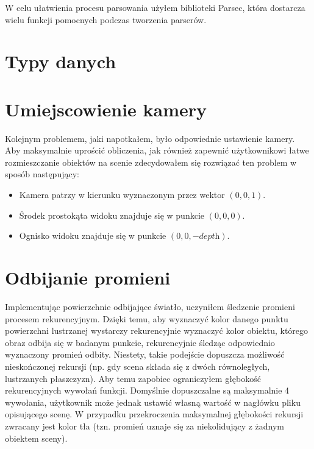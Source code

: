 \documentclass[11pt,a4paper]{article}
\begin{document}
W celu ułatwienia procesu parsowania użyłem biblioteki Parsec, która dostarcza wielu funkcji pomocnych podczas tworzenia parserów.
\section{Typy danych}

\section{Umiejscowienie kamery}
Kolejnym problemem, jaki napotkałem, było odpowiednie ustawienie kamery. Aby maksymalnie uprościć obliczenia, jak również zapewnić użytkownikowi łatwe rozmieszczanie obiektów na scenie zdecydowałem się rozwiązać ten problem w sposób następujący:
\begin{itemize}
\item Kamera patrzy w kierunku wyznaczonym przez wektor $(0, 0, 1)$.
\item Środek prostokąta widoku znajduje się w punkcie $(0, 0, 0)$.
\item Ognisko widoku znajduje się w punkcie $(0, 0, -\textit{depth})$.
\end{itemize}
\section{Odbijanie promieni}
Implementując powierzchnie odbijające światło, uczyniłem śledzenie promieni procesem rekurencyjnym. Dzięki temu, aby wyznaczyć kolor danego punktu powierzchni lustrzanej wystarczy rekurencyjnie wyznaczyć kolor obiektu, którego obraz odbija się w badanym punkcie, rekurencyjnie śledząc odpowiednio wyznaczony promień odbity. Niestety, takie podejście dopuszcza możliwość nieskończonej rekursji (np. gdy scena składa się z dwóch równoległych, lustrzanych płaszczyzn). Aby temu zapobiec ograniczyłem głębokość rekurencyjnych wywołań funkcji. Domyślnie dopuszczalne są maksymalnie 4 wywołania, użytkownik może jednak ustawić własną wartość w nagłówku pliku opisującego scenę. W przypadku przekroczenia maksymalnej głębokości rekursji zwracany jest kolor tła (tzn. promień uznaje się za niekolidujący z żadnym obiektem sceny).
\end{document}
